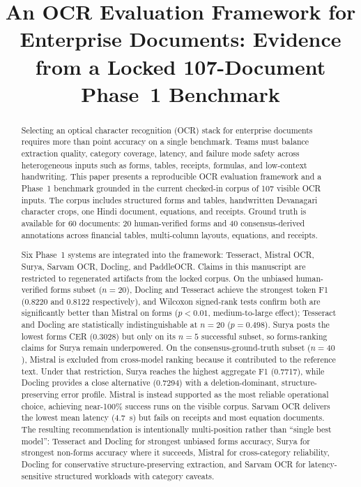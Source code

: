 \documentclass[conference]{IEEEtran}
\begin{document}
\title{An OCR Evaluation Framework for Enterprise Documents: Evidence from a Locked 107-Document Phase~1 Benchmark}

\author{
}

\maketitle

\begin{abstract}
Selecting an optical character recognition (OCR) stack for enterprise documents requires more than point accuracy on a single benchmark. Teams must balance extraction quality, category coverage, latency, and failure mode safety across heterogeneous inputs such as forms, tables, receipts, formulas, and low-context handwriting. This paper presents a reproducible OCR evaluation framework and a Phase~1 benchmark grounded in the current checked-in corpus of 107 visible OCR inputs. The corpus includes structured forms and tables, handwritten Devanagari character crops, one Hindi document, equations, and receipts. Ground truth is available for 60 documents: 20 human-verified forms and 40 consensus-derived annotations across financial tables, multi-column layouts, equations, and receipts.

Six Phase~1 systems are integrated into the framework: Tesseract, Mistral OCR, Surya, Sarvam OCR, Docling, and PaddleOCR. Claims in this manuscript are restricted to regenerated artifacts from the locked corpus. On the unbiased human-verified forms subset ($n=20$), Docling and Tesseract achieve the strongest token F1 (0.8220 and 0.8122 respectively), and Wilcoxon signed-rank tests confirm both are significantly better than Mistral on forms ($p<0.01$, medium-to-large effect); Tesseract and Docling are statistically indistinguishable at $n=20$ ($p=0.498$). Surya posts the lowest forms CER (0.3028) but only on its $n=5$ successful subset, so forms-ranking claims for Surya remain underpowered. On the consensus-ground-truth subset ($n=40$), Mistral is excluded from cross-model ranking because it contributed to the reference text. Under that restriction, Surya reaches the highest aggregate F1 (0.7717), while Docling provides a close alternative (0.7294) with a deletion-dominant, structure-preserving error profile. Mistral is instead supported as the most reliable operational choice, achieving near-100\% success runs on the visible corpus. Sarvam OCR delivers the lowest mean latency (4.7~s) but fails on receipts and most equation documents. The resulting recommendation is intentionally multi-position rather than ``single best model'': Tesseract and Docling for strongest unbiased forms accuracy, Surya for strongest non-forms accuracy where it succeeds, Mistral for cross-category reliability, Docling for conservative structure-preserving extraction, and Sarvam OCR for latency-sensitive structured workloads with category caveats.
\end{abstract}
\end{document}
